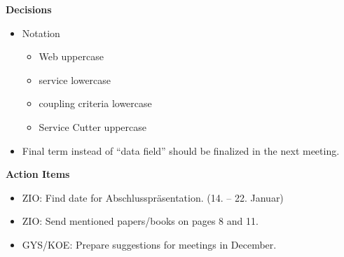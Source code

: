 \textbf{Decisions}

\begin{itemize}
\item Notation
	\begin{itemize}
	\item Web uppercase
	\item service lowercase
	\item coupling criteria lowercase
	\item Service Cutter uppercase
	\end{itemize}
\item Final term instead of \enquote{data field} should be finalized in the next meeting.
\end{itemize}
 
\textbf{Action Items}

\begin{itemize}
\item ZIO: Find date for Abschlusspräsentation. (14. – 22. Januar)
\item ZIO: Send mentioned papers/books on pages 8 and 11.
\item GYS/KOE: Prepare suggestions for meetings in December.
\end{itemize}

